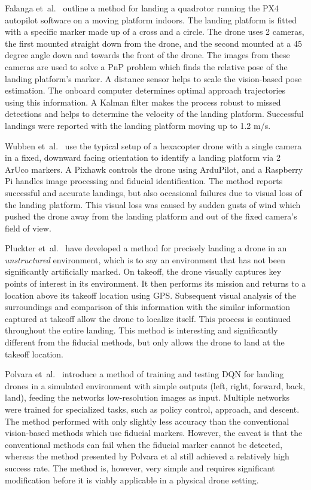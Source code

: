 Falanga et~al.~\cite{vision_based_x_platform} outline a method for landing a quadrotor running the PX4 autopilot software on a moving platform indoors. The landing platform is fitted with a specific marker made up of a cross and a circle. The drone uses 2 cameras, the first mounted straight down from the drone, and the second mounted at a 45 degree angle down and towards the front of the drone. The images from these cameras are used to solve a  {PnP} problem which finds the relative pose of the landing platform's marker. A distance sensor helps to scale the vision-based pose estimation. The onboard computer determines optimal approach trajectories using this information. A Kalman filter makes the process robust to missed detections and helps to determine the velocity of the landing platform. Successful landings were reported with the landing platform moving up to 1.2 m/s.

Wubben et~al.~\cite{accurate_landing_UAV_ground_pattern} use the typical setup of a hexacopter drone with a single camera in a fixed, downward facing orientation to identify a landing platform via 2 ArUco markers. A Pixhawk controls the drone using ArduPilot, and a Raspberry Pi handles image processing and fiducial identification. The method reports successful and accurate landings, but also occasional failures due to visual loss of the landing platform. This visual loss was caused by sudden gusts of wind which pushed the drone away from the landing platform and out of the fixed camera's field of view.

Pluckter et~al.~\cite{drone_landing_unstructured_environments} have developed a method for precisely landing a drone in an \textit{unstructured} environment, which is to say an environment that has not been significantly artificially marked. On takeoff, the drone visually captures key points of interest in its environment. It then performs its mission and returns to a location above its takeoff location using  {GPS}. Subsequent visual analysis of the surroundings and comparison of this information with the similar information captured at takeoff allow the drone to localize itself. This process is continued throughout the entire landing. This method is interesting and significantly different from the fiducial methods, but only allows the drone to land at the takeoff location.

Polvara et~al.~\cite{drq_landing} introduce a method of training and testing {DQN} for landing drones in a simulated environment with simple outputs (left, right, forward, back, land), feeding the networks low-resolution images as input. Multiple networks were trained for specialized tasks, such as policy control, approach, and descent. The method performed with only slightly less accuracy than the conventional vision-based methods which use fiducial markers. However, the caveat is that the conventional methods can fail when the fiducial marker cannot be detected, whereas the method presented by Polvara et al still achieved a relatively high success rate. The method is, however, very simple and requires significant modification before it is viably applicable in a physical drone setting.

